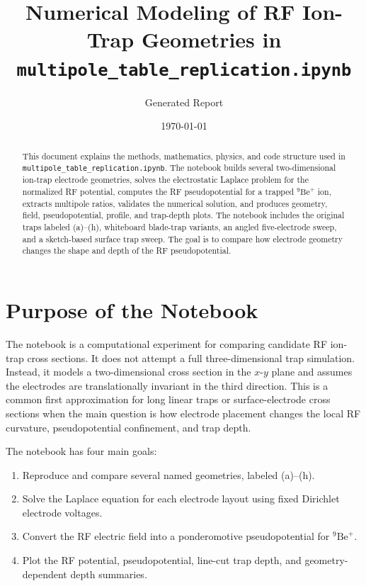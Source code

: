 \documentclass[11pt]{article}
\title{Numerical Modeling of RF Ion-Trap Geometries in \texttt{multipole\_table\_replication.ipynb}}
\author{Generated Report}
\date{\today}
\begin{document}
\maketitle

\begin{abstract}
This document explains the methods, mathematics, physics, and code structure used
in \texttt{multipole\_table\_replication.ipynb}. The notebook builds several
two-dimensional ion-trap electrode geometries, solves the electrostatic
Laplace problem for the normalized RF potential, computes the RF
pseudopotential for a trapped \({}^{9}\mathrm{Be}^{+}\) ion, extracts
multipole ratios, validates the numerical solution, and produces geometry,
field, pseudopotential, profile, and trap-depth plots. The notebook includes the
original traps labeled (a)--(h), whiteboard blade-trap variants, an angled
five-electrode sweep, and a sketch-based surface trap sweep. The goal is to
compare how electrode geometry changes the shape and depth of the RF
pseudopotential.
\end{abstract}

\tableofcontents
\newpage

\section{Purpose of the Notebook}

The notebook is a computational experiment for comparing candidate RF ion-trap
cross sections. It does not attempt a full three-dimensional trap simulation.
Instead, it models a two-dimensional cross section in the \(x\)-\(y\) plane and
assumes the electrodes are translationally invariant in the third direction.
This is a common first approximation for long linear traps or surface-electrode
cross sections when the main question is how electrode placement changes the
local RF curvature, pseudopotential confinement, and trap depth.

The notebook has four main goals:
\begin{enumerate}[label=\arabic*.]
  \item Reproduce and compare several named geometries, labeled (a)--(h).
  \item Solve the Laplace equation for each electrode layout using fixed
        Dirichlet electrode voltages.
  \item Convert the RF electric field into a ponderomotive pseudopotential for
        \({}^{9}\mathrm{Be}^{+}\).
  \item Plot the RF potential, pseudopotential, line-cut trap depth, and
        geometry-dependent depth summaries.
\end{enumerate}
\end{document}
